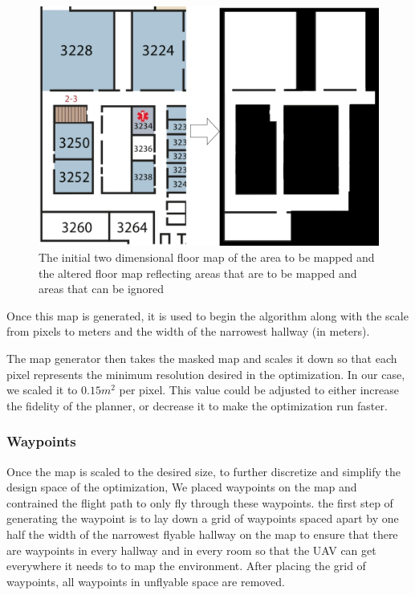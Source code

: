 \documentclass[letterpaper, 10 pt, conference]{ieeeconf}  %
\begin{document}
\begin{figure}
\centering
\includegraphics[width=0.8\linewidth]{figures/map_bw.png}
\caption{The initial two dimensional floor map of the area to be mapped and the altered floor map reflecting areas that are to be mapped and areas that can be ignored}
\label{fig:map_gen}
\end{figure}

Once this map is generated, it is used to begin the algorithm along with the scale from pixels to meters and the width of the narrowest hallway (in meters).

The map generator then takes the masked map and scales it down so that each pixel represents the minimum resolution desired in the optimization. In our case, we scaled it to $0.15 m^{2}$ per pixel. This value could be adjusted to either increase the fidelity of the planner, or decrease it to make the optimization run faster.

\subsubsection{Waypoints}

Once the map is scaled to the desired size, to further discretize and simplify the design space of the optimization, We placed waypoints on the map and contrained the flight path to only fly through these waypoints. the first step of generating the waypoint is to lay down a grid of waypoints spaced apart by one half the width of the narrowest flyable hallway on the map to ensure that there are waypoints in every hallway and in every room so that the UAV can get everywhere it needs to to map the environment. After placing the grid of waypoints, all waypoints in unflyable space are removed.
\end{document}
